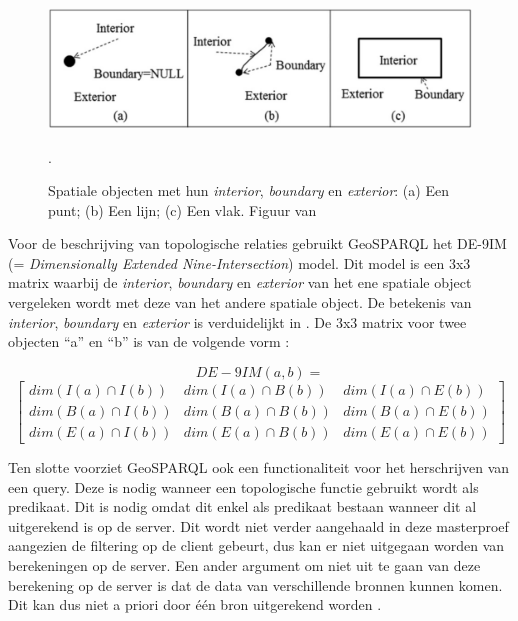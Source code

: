 \documentclass[twocolumn]{phdsymp} %
\begin{document}
\begin{figure}[ht]
    \centering
    \includegraphics[width=\linewidth]{images/spatial_objects_DE-9IM.png}
    \caption{Spatiale objecten met hun \textit{interior}, \textit{boundary} en \textit{exterior}: (a) Een punt; (b) Een lijn; (c) Een vlak. Figuur van \protect\cite{shen2018classification}}.
    \label{fig:abstr_de-9im}
\end{figure}

Voor de beschrijving van topologische relaties gebruikt GeoSPARQL het DE-9IM (= \textit{Dimensionally Extended Nine-Intersection}) model. Dit model is een 3x3 matrix waarbij de \textit{interior}, \textit{boundary} en \textit{exterior} van het ene spatiale object vergeleken wordt met deze van het andere spatiale object. De betekenis van \textit{interior}, \textit{boundary} en \textit{exterior} is verduidelijkt in . De 3x3 matrix voor twee objecten ``a'' en ``b'' is van de volgende vorm \cite{shen2018classification}:

\begin{equation*}
    DE-9IM(a,b) = 
\end{equation*}
\begin{equation*}
    \begin{bmatrix}
        dim(I(a)\cap I(b)) & dim(I(a)\cap B(b)) & dim(I(a)\cap E(b))\\
        dim(B(a)\cap I(b)) & dim(B(a)\cap B(b)) & dim(B(a)\cap E(b))\\
        dim(E(a)\cap I(b)) & dim(E(a)\cap B(b)) & dim(E(a)\cap E(b))
    \end{bmatrix}
\end{equation*}

Ten slotte voorziet GeoSPARQL ook een functionaliteit voor het herschrijven van een query. Deze is nodig wanneer een topologische functie gebruikt wordt als predikaat. Dit is nodig omdat dit enkel als predikaat bestaan wanneer dit al uitgerekend is op de server. Dit wordt niet verder aangehaald in deze masterproef aangezien de filtering op de client gebeurt, dus kan er niet uitgegaan worden van berekeningen op de server. Een ander argument om niet uit te gaan van deze berekening op de server is dat de data van verschillende bronnen kunnen komen. Dit kan dus niet a priori door één bron uitgerekend worden \cite{ogcdocs}.
\end{document}
